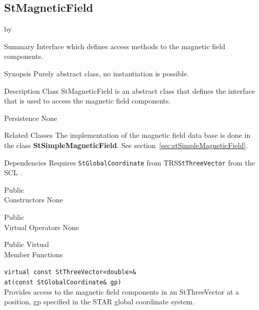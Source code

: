 \documentclass[twoside]{article}
\newcommand{\name}[1]{\textsf{#1}}%
\newcommand{\comp}[1]{\texttt{#1}}%
\newcommand{\entrylabel}[1]{\mbox{\textbf{{#1}}}\hfil}%
\newenvironment{entry}
{\begin{list}{}%
    {\renewcommand{\makelabel}{\entrylabel}%
     \setlength{\labelwidth}{90pt}%
     \setlength{\leftmargin}{\labelwidth}
     \advance\leftmargin by \labelsep%
      }%
    }%
  {\end{list}}
\newcommand{\Entrylabel}[1]%
{\raisebox{0pt}[1ex][0pt]{\makebox[\labelwidth][l]%
    {\parbox[t]{\labelwidth}{\hspace{0pt}\textbf{{#1}}}}}}
\newenvironment{Entry}%
{\renewcommand{\entrylabel}{\Entrylabel}\begin{entry}}%
  {\end{entry}}
\begin{document}
\subsection{StMagneticField} 
\label{sec:stMagneticField}
\begin{Entry}
\item[Summary]
  Interface which defines access methods to the magnetic field components.

\item[Synopsis]
  Purely abstract class, no instantiation is  possible.
  
\item[Description]
Class StMagneticField is an abstract class that defines
the interface that is used to access the magnetic field components.

\item[Persistence]
   None

\item[Related Classes]
The implementation of the magnetic field data base is done in
the class {\bf StSimpleMagneticField}.  
See section~\ref{sec:stSimpleMagneticField}.

\item[Dependencies]
Requires \comp{StGlobalCoordinate} 
from \name{TRS}\comp{StThreeVector} from the SCL .

\item[Public \\ Constructors]
   None

\item[Public \\ Virtual Operators]
   None

\item[Public Virtual \\ Member Functions]

  \verb+virtual const StThreeVector<double>&+\\
  \verb+at(const StGlobalCoordinate& gp)+\\
  Provides access to the magnetic field components in an StThreeVector
  at a position, gp specified in the STAR global coordinate system.

\end{Entry}
\clearpage

%
%
\end{document}
